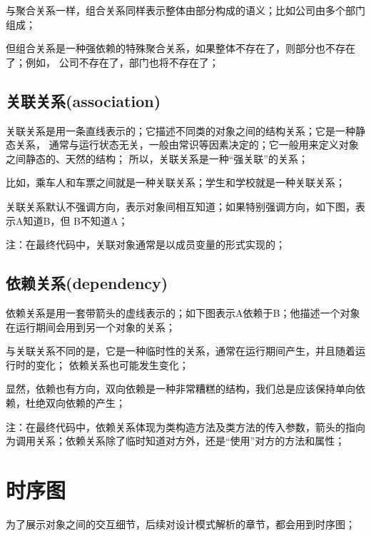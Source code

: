 \documentclass[letterpaper,10pt,english]{sphinxmanual}
\begin{document}
\noindent{}

\sphinxAtStartPar
与聚合关系一样，组合关系同样表示整体由部分构成的语义；比如公司由多个部门组成；

\sphinxAtStartPar
但组合关系是一种强依赖的特殊聚合关系，如果整体不存在了，则部分也不存在了；例如，
公司不存在了，部门也将不存在了；


\subsection{关联关系(association)}
\label{\detokenize{read_uml:association}}
\sphinxAtStartPar
关联关系是用一条直线表示的；它描述不同类的对象之间的结构关系；它是一种静态关系，
通常与运行状态无关，一般由常识等因素决定的；它一般用来定义对象之间静态的、天然的结构；
所以，关联关系是一种“强关联”的关系；

\sphinxAtStartPar
比如，乘车人和车票之间就是一种关联关系；学生和学校就是一种关联关系；

\sphinxAtStartPar
关联关系默认不强调方向，表示对象间相互知道；如果特别强调方向，如下图，表示A知道B，但
B不知道A；

\noindent{}

\sphinxAtStartPar
注：在最终代码中，关联对象通常是以成员变量的形式实现的；


\subsection{依赖关系(dependency)}
\label{\detokenize{read_uml:dependency}}
\sphinxAtStartPar
依赖关系是用一套带箭头的虚线表示的；如下图表示A依赖于B；他描述一个对象在运行期间会用到另一个对象的关系；

\noindent{}

\sphinxAtStartPar
与关联关系不同的是，它是一种临时性的关系，通常在运行期间产生，并且随着运行时的变化；
依赖关系也可能发生变化；

\sphinxAtStartPar
显然，依赖也有方向，双向依赖是一种非常糟糕的结构，我们总是应该保持单向依赖，杜绝双向依赖的产生；

\sphinxAtStartPar
注：在最终代码中，依赖关系体现为类构造方法及类方法的传入参数，箭头的指向为调用关系；依赖关系除了临时知道对方外，还是“使用”对方的方法和属性；


\section{时序图}
\label{\detokenize{read_uml:id3}}
\sphinxAtStartPar
为了展示对象之间的交互细节，后续对设计模式解析的章节，都会用到时序图；
\end{document}
